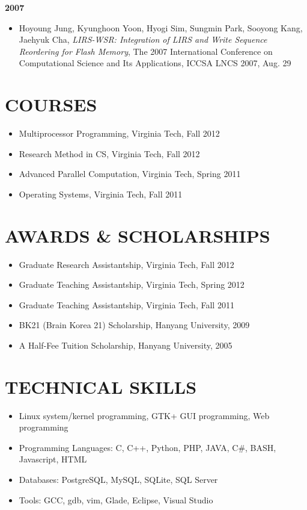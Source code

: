 \documentclass{res}
\begin{document}
\begin{resume}
{\bf 2007}
 \begin{itemize}
 \item Hoyoung Jung, Kyunghoon Yoon, Hyogi Sim, Sungmin Park, Sooyong Kang,
 Jaehyuk Cha,
 {\it LIRS-WSR: Integration of LIRS and Write Sequence Reordering for Flash
 Memory},
 The 2007 International Conference on Computational Science and Its
 Applications, ICCSA LNCS 2007, Aug. 29
 \end{itemize}

\section{COURSES}
\vspace{0.2in}
 \begin{itemize}
  \item Multiprocessor Programming, Virginia Tech, Fall 2012
  \item Research Method in CS, Virginia Tech, Fall 2012
  \item Advanced Parallel Computation, Virginia Tech, Spring 2011
  \item Operating Systems, Virginia Tech, Fall 2011
 \end{itemize}

\section{AWARDS \& SCHOLARSHIPS}
\vspace{0.2in}
 \begin{itemize}
  \item Graduate Research Assistantship, Virginia Tech, Fall 2012
  \item Graduate Teaching Assistantship, Virginia Tech, Spring 2012
  \item Graduate Teaching Assistantship, Virginia Tech, Fall 2011
  \item BK21 (Brain Korea 21) Scholarship, Hanyang University, 2009
  \item A Half-Fee Tuition Scholarship, Hanyang University, 2005
 \end{itemize}

\section{TECHNICAL SKILLS}
\vspace{0.2in}
 \begin{itemize}
  \item Linux system/kernel programming, GTK+ GUI programming, Web programming
  \item Programming Languages: C, C++, Python, PHP, JAVA, C\#, BASH, Javascript, HTML
  \item Databases: PostgreSQL, MySQL, SQLite, SQL Server
  \item Tools: GCC, gdb, vim, Glade, Eclipse, Visual Studio
 \end{itemize}
 
\end{resume}
\end{document}
